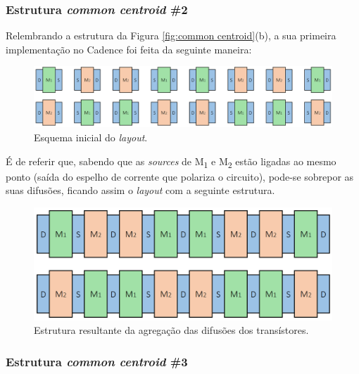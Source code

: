 \documentclass[11pt]{article}
\numberwithin{equation}{section}
\begin{document}
\subsubsection{Estrutura \textit{common centroid} \#2}

Relembrando a estrutura da Figura \ref{fig:common centroid}(b), a sua primeira implementação no Cadence foi feita da seguinte maneira:

\begin{figure}[H]
	\centering
	\includegraphics[keepaspectratio=true, scale=0.30]{teoricas/layout/cc2_1}
	\vspace{-0.5em}
	\caption{Esquema inicial do \textit{layout}.}
	\vspace{-0.8em} 
\end{figure}

É de referir que, sabendo que as \textit{sources} de M\textsubscript{1} e M\textsubscript{2} estão ligadas ao mesmo ponto (saída do espelho de corrente que polariza o circuito), pode-se sobrepor as suas difusões, ficando assim o \textit{layout} com a seguinte estrutura.

\begin{figure}[H]
	\centering
	\includegraphics[keepaspectratio=true, scale=0.30]{teoricas/layout/cc2_2}
	\vspace{-0.5em}
	\caption{Estrutura resultante da agregação das difusões dos transístores.}
	\vspace{-0.8em} 
\end{figure}

\subsubsection{Estrutura \textit{common centroid} \#3}
\end{document}
